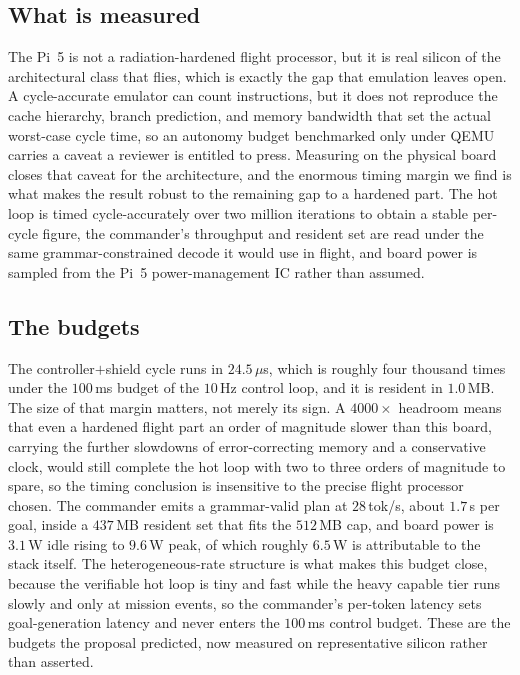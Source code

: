 \documentclass[11pt]{article}
\begin{document}
\subsection{What is measured} The Pi~5 is not a radiation-hardened flight
processor, but it is real silicon of the architectural class that flies, which is exactly the gap
that emulation leaves open. A cycle-accurate emulator can count instructions, but it does not
reproduce the cache hierarchy, branch prediction, and memory bandwidth that set the actual
worst-case cycle time, so an autonomy budget benchmarked only under QEMU carries a caveat a
reviewer is entitled to press. Measuring on the physical board closes that caveat for the
architecture, and the enormous timing margin we find is what makes the result robust to the
remaining gap to a hardened part. The hot loop is timed cycle-accurately over two million
iterations to obtain a stable per-cycle figure, the commander's throughput and resident set are
read under the same grammar-constrained decode it would use in flight, and board power is sampled
from the Pi~5 power-management IC rather than assumed.



\subsection{The budgets} The controller$+$shield cycle runs in $24.5\,\mu$s, which is
roughly four thousand times under the $100$\,ms budget of the $10$\,Hz control loop, and it is
resident in $1.0$\,MB. The size of that margin matters, not merely its sign. A
$4000\times$ headroom means that even a hardened flight part an order of magnitude slower than this
board, carrying the further slowdowns of error-correcting memory and a conservative clock, would
still complete the hot loop with two to three orders of magnitude to spare, so the timing
conclusion is insensitive to the precise flight processor chosen. The commander emits a
grammar-valid plan at $28$\,tok/s, about $1.7$\,s per goal, inside a $437$\,MB resident set that
fits the $512$\,MB cap, and board power is $3.1$\,W idle rising to $9.6$\,W peak, of which roughly
$6.5$\,W is attributable to the stack itself. The heterogeneous-rate structure is what makes this
budget close, because the verifiable hot loop is tiny and fast while the heavy capable tier runs
slowly and only at mission events, so the commander's per-token latency sets goal-generation
latency and never enters the $100$\,ms control budget. These are the budgets the proposal
predicted, now measured on representative silicon rather than asserted.
\end{document}
